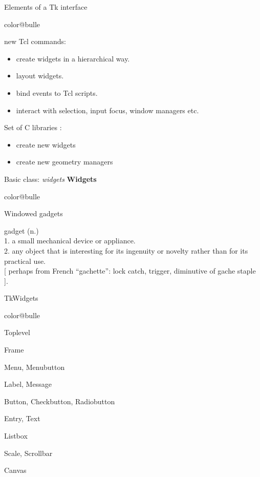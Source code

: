 \documentclass[a4paper,landscape,smooth]{show}
\begin{document}

\begin{tslide}{Elements of a Tk interface}
   \vfill
   \begin{bitemize}{color@bulle}
      \item new Tcl commands:
	 \begin{itemize}
	    \item create widgets in a hierarchical way.
            \item layout widgets.
            \item bind events to Tcl scripts.
            \item interact with selection, input focus, window managers etc. 
	 \end{itemize}

      \item Set of C libraries :
	 \begin{itemize}
	    \item create new widgets 
	    \item create new geometry managers
	 \end{itemize}
   \end{bitemize}
   \vfill
\end{tslide}


\begin{tslide}{Basic class: {\em widgets}}
   \vfill
   {\bf Widgets}
   \begin{bitemize}{color@bulle}
      \item Windowed gadgets
      \item gadget (n.)\\
	 1. a small mechanical device or appliance.\\
	 2. any object that is interesting for its ingenuity or novelty
	    rather than for its practical use.\\

	 [ perhaps from French ``gachette'': lock catch, trigger,
	    diminutive of gache staple ].
   \end{bitemize}
   \vfill
\end{tslide}


\begin{part}{Tk}{Widgets}
   \vfill\small
   \begin{bitemize}{color@bulle}
      \item Toplevel
      \item Frame
      \item Menu, Menubutton
      \item Label, Message
      \item Button, Checkbutton, Radiobutton
      \item Entry, Text
      \item Listbox
      \item Scale, Scrollbar
      \item Canvas
   \end{bitemize}
   \vfill
\end{part}
\end{document}
